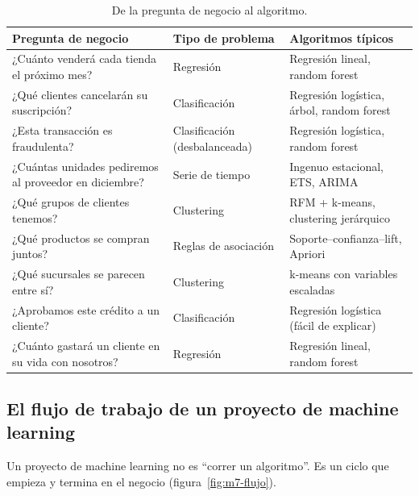 \begin{table}[H]
\centering
\small
\caption{De la pregunta de negocio al algoritmo.}
\label{tab:m7-problemas}
\begin{tabularx}{\textwidth}{>{\raggedright\arraybackslash}X
                              >{\raggedright\arraybackslash}p{3.1cm}
                              >{\raggedright\arraybackslash}p{4.4cm}}
\toprule
\textbf{Pregunta de negocio} & \textbf{Tipo de problema} & \textbf{Algoritmos típicos} \\
\midrule
¿Cuánto venderá cada tienda el próximo mes? & Regresión & Regresión lineal, random forest \\
¿Qué clientes cancelarán su suscripción? & Clasificación & Regresión logística, árbol, random forest \\
¿Esta transacción es fraudulenta? & Clasificación (desbalanceada) & Regresión logística, random forest \\
¿Cuántas unidades pediremos al proveedor en diciembre? & Serie de tiempo & Ingenuo estacional, ETS, ARIMA \\
¿Qué grupos de clientes tenemos? & Clustering & RFM + k-means, clustering jerárquico \\
¿Qué productos se compran juntos? & Reglas de asociación & Soporte--confianza--lift, Apriori \\
¿Qué sucursales se parecen entre sí? & Clustering & k-means con variables escaladas \\
¿Aprobamos este crédito a un cliente? & Clasificación & Regresión logística (fácil de explicar) \\
¿Cuánto gastará un cliente en su vida con nosotros? & Regresión & Regresión lineal, random forest \\
\bottomrule
\end{tabularx}
\end{table}

\subsection{El flujo de trabajo de un proyecto de machine learning}
\label{sec:m7-flujo}

Un proyecto de machine learning no es ``correr un algoritmo''. Es un ciclo que
empieza y termina en el negocio (figura~\ref{fig:m7-flujo}).

